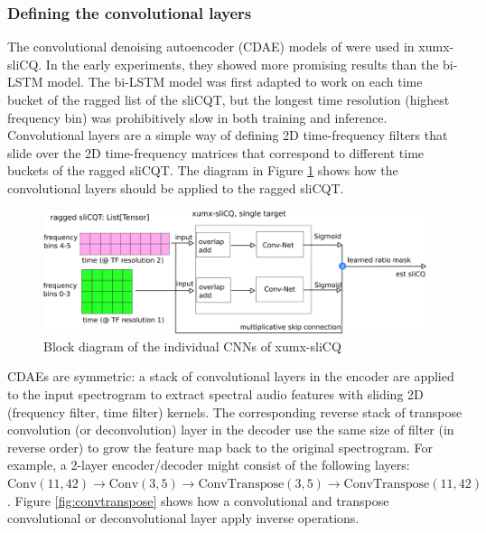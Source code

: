\documentclass[report.tex]{subfiles}
\begin{document}
\subsubsection{Defining the convolutional layers}
\label{sec:convlayers}

The convolutional denoising autoencoder (CDAE) models of \textcite{plumbley1, plumbley2} were used in xumx-sliCQ. In the early experiments, they showed more promising results than the bi-LSTM model. The bi-LSTM model was first adapted to work on each time bucket of the ragged list of the sliCQT, but the longest time resolution (highest frequency bin) was prohibitively slow in both training and inference. Convolutional layers are a simple way of defining 2D time-frequency filters that slide over the 2D time-frequency matrices that correspond to different time buckets of the ragged sliCQT. The diagram in Figure \ref{fig:cdaeslicqt} shows how the convolutional layers should be applied to the ragged sliCQT.

\begin{figure}[ht]
	\centering
	\includegraphics[width=\textwidth]{./images-blockdiagrams/xumx_slicq_pertarget_largefont.png}
	\caption{Block diagram of the individual CNNs of xumx-sliCQ}
	\label{fig:cdaeslicqt}
\end{figure}

CDAEs are symmetric: a stack of convolutional layers in the encoder are applied to the input spectrogram to extract spectral audio features with sliding 2D (frequency filter, time filter) kernels. The corresponding reverse stack of transpose convolution (or deconvolution) layer in the decoder use the same size of filter (in reverse order) to grow the feature map back to the original spectrogram. For example, a 2-layer encoder/decoder might consist of the following layers: $\text{Conv}(11,42) \rightarrow \text{Conv}(3,5) \rightarrow \text{ConvTranspose}(3,5) \rightarrow \text{ConvTranspose}(11,42)$. Figure \ref{fig:convtranspose} shows how a convolutional and transpose convolutional or deconvolutional layer apply inverse operations.
\end{document}
